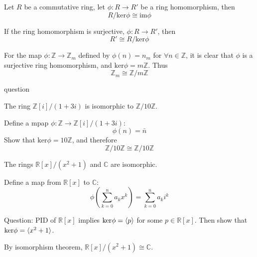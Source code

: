 \begin{theorem}
Let $R$ be a commutative ring, let $\phi:R\to R'$ be a ring homomorphism, then
\[
R/\mbox{ker}\phi\cong\mbox{im}\phi
\]
\end{theorem}
\begin{corollary}
If the ring homomorphism is surjective, $\phi:R\to R'$, then
\[
R'\cong R/\mbox{ker}\phi
\]
\end{corollary}
\begin{example}
For the map $\phi:\mathbb{Z}\to\mathbb{Z}_m$ defined by $\phi(n)=n_m$ for $\forall n\in\mathbb{Z}$, it is clear that $\phi$ is a surjective ring homomorphism, and $\mbox{ker}\phi=m\mathbb{Z}$. Thus
\[
\mathbb{Z}_m\cong\mathbb{Z}/m\mathbb{Z}
\]
\end{example}
question
\begin{example}
The ring $\mathbb{Z}[i]/(1+3i)$ is isomorphic to $\mathbb{Z}/10\mathbb{Z}$.

Define a mpap $\phi:\mathbb{Z}\to\mathbb{Z}[i]/(1+3i)$:
\[
\phi(n)=\bar n
\]
Show that $\mbox{ker}\phi=10\mathbb{Z}$, and therefore
\[
\mathbb{Z}/10\mathbb{Z}\cong \mathbb{Z}/10\mathbb{Z}
\]
\end{example}
\begin{example}
The rings $\mathbb{R}[x]/(x^2+1)$ and $\mathbb{C}$ are isomorphic.

Define a map from $\mathbb{R}[x]$ to $\mathbb{C}$:
\[
\phi(\sum_{k=0}^n a_kx^k)=\sum_{k=0}^na_ki^k
\]

Question: PID of $\mathbb{R}[x]$ implies $\mbox{ker}\phi=\langle p\rangle$ for some $p\in\mathbb{R}[x]$. Then show that $\mbox{ker}\phi=\langle x^2+1\rangle$.

By isomorphism theorem, $\mathbb{R}[x]/(x^2+1)\cong\mathbb{C}$.

\end{example}














